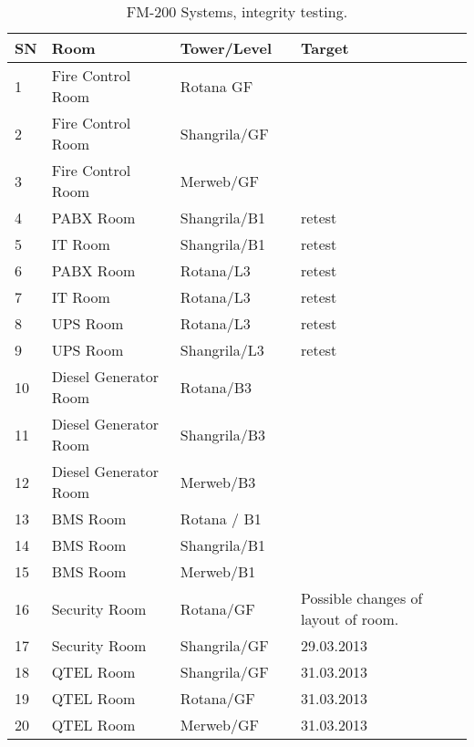 \begin{table}[htbp]
\begin{tabular}{llllp{2.8cm}}
\toprule
SN	&Room 	      &Tower/Level	& \WIR &Target\\ 
\midrule
1	&Fire Control Room	  &Rotana GF	  &\ch& \ddd\\
2	&Fire Control Room	  &Shangrila/GF&\ch&  \ddd\\
3	&Fire Control Room	  &Merweb/GF	&\ch& \ddd\\
\midrule
4	&PABX Room	      &Shangrila/B1	&\ch& retest \ddd\\
5	&IT Room	           &Shangrila/B1	  &\ch&retest \ddd\\
6	&PABX Room	      &Rotana/L3	    &\ch&retest \ddd\\
7	&IT Room	           &Rotana/L3	     &\ch&retest \ddd\\
\midrule
8	&UPS Room	           &Rotana/L3	     &\ch  &retest \ddd\\
9	&UPS Room	           &Shangrila/L3	&\ch  &retest \ddd\\
\midrule
10	&Diesel Generator Room	&Rotana/B3	&\ch& \ddd\\
11	&Diesel Generator Room	&Shangrila/B3	 &\ch& \ddd\\
12	&Diesel Generator Room	&Merweb/B3	&\ch& \ddd\\
\midrule
13	&BMS Room	            &Rotana / B1	&\ch& \ddd\\
14	&BMS Room	            &Shangrila/B1	&\ch& \ddd\\
15	&BMS Room	            &Merweb/B1	&\ch& \ddd\\
\midrule
16	&Security Room	&Rotana/GF	&&\Danger Possible changes of layout of room. \\
17	&Security Room	&Shangrila/GF	&&29.03.2013 \\
\midrule
18	&QTEL Room	&Shangrila/GF	&& 31.03.2013\\
19	&QTEL Room	&Rotana/GF	&& 31.03.2013\\
20	&QTEL Room	&Merweb/GF	&& 31.03.2013\\
\bottomrule
\end{tabular}
\caption{FM-200 Systems, integrity testing.}
\label{FM-200}
\end{table}




%

